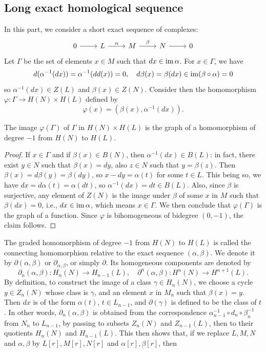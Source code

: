 \subsection{Long exact homological sequence}
In this part, we consider a short exact sequence of complexes:
\[\begin{tikzcd}
0\ar[r]&L\ar[r,"\alpha"]&M\ar[r,"\beta"]&N\ar[r]&0
\end{tikzcd}\]
Let $\Gamma$ be the set of elements $x\in M$ such that $dx\in\operatorname{im}\alpha$. For $x\in\Gamma$, we have
\[d(\alpha^{-1}(dx))=\alpha^{-1}(dd(x))=0,\quad d\beta(x)=\beta(dx)\in\operatorname{im}(\beta\circ\alpha)=0\]
so $\alpha^{-1}(dx)\in Z(L)$ and $\beta(x)\in Z(N)$. Consider then the homomorphism $\varphi:\Gamma\to H(N)\times H(L)$ defined by
\[\varphi(x)=(\beta(x),\alpha^{-1}(dx)).\]
\begin{lemma}\label{module complex long exact sequence connecting lemma}
The image $\varphi(\Gamma)$ of $\Gamma$ in $H(N)\times H(L)$ is the graph of a homomorphism of degree $-1$ from $H(N)$ to $H(L)$. 
\end{lemma}
\begin{proof}
If $x\in\Gamma$ and if $\beta(x)\in B(N)$, then $\alpha^{-1}(dx)\in B(L)$: in fact, there exist $y\in N$ such that $\beta(x)=dy$, also $z\in N$ such that $y=\beta(z)$. Then $\beta(x)=d\beta(y)=\beta(dy)$, so $x-dy=\alpha(t)$ for some $t\in L$. This being so, we have $dx=d\alpha(t)=\alpha(dt)$, so $\alpha^{-1}(dx)=dt\in B(L)$. Also, since $\beta$ is surjective, any element of $Z(N)$ is the image under $\beta$ of some $x$ in $M$ such that $\beta(dx)=0$, i.e., $dx\in\operatorname{im}\alpha$, which means $x\in\Gamma$. We then conclude that $\varphi(\Gamma)$ is the graph of a function. Since $\varphi$ is bihomogeneous of bidegree $(0,-1)$, the claim follows.
\end{proof}
The graded homomorphism of degree $-1$ from $H(N)$ to $H(L)$ is called the connecting homomorphism relative to the exact sequence $(\alpha,\beta)$. We denote it by $\partial(\alpha,\beta)$ or $\partial_{\alpha,\beta}$, or simply $\partial$. Its homogeneous components are denoted by
\[\partial_n(\alpha,\beta):H_n(N)\to H_{n-1}(L),\quad \partial^n(\alpha,\beta):H^n(N)\to H^{n+1}(L).\]
By definition, to construct the image of a class $\gamma\in H_n(N)$, we choose a cycle $y\in Z_n(N)$ whose class is $\gamma$, and an element $x$ in $M_n$ such that $\beta(x)=y$. Then $dx$ is of the form $\alpha(t)$, $t\in L_{n-1}$, and $\partial(\gamma)$ is defined to be the class of $t$. In other words, $\partial_n(\alpha,\beta)$ is obtained from the correspondence $\alpha_{n-1}^{-1}\circ d_n\circ\beta_n^{-1}$ from $N_n$ to $L_{n-1}$, by passing to subsets $Z_n(N)$ and $Z_{n-1}(L)$, then to their quotients $H_n(N)$ and $H_{n-1}(L)$. This then shows that, if we replace $L,M,N$ and $\alpha,\beta$ by $L[r],M[r],N[r]$ and $\alpha[r],\beta[r]$, then
